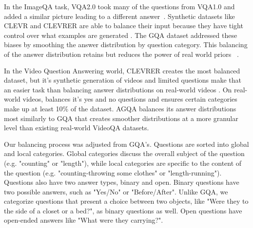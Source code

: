In the ImageQA task, VQA2.0 took many of the questions from VQA1.0 and added a similar picture leading to a different answer~\cite{goyal2017making}. Synthetic datasets like CLEVR and CLEVRER are able to balance their input because they have tight control over what examples are generated \cite{johnson2017clevr, yi2019clevrer}. The GQA dataset addressed these biases by smoothing the answer distribution by question category. This balancing of the answer distribution retains but reduces the power of real world priors ~\cite{hudson2019gqa}. 

In the Video Question Answering world, CLEVRER creates the most balanced dataset, but it's synthetic generation of videos and limited questions make that an easier task than balancing answer distributions on real-world videos \cite{yi2019clevrer}. On real-world videos, \cite{yu2019activitynet} balances it's yes and no questions and ensures certain categories make up at least 10\% of the dataset. AGQA balances its answer distributions most similarly to GQA that creates smoother distributions at a more granular level than existing real-world VideoQA datasets. 

Our balancing process was adjusted from GQA's. Questions are sorted into global and local categories. Global categories discuss the overall subject of the question (e.g. "counting" or "length"), while local categories are specific to the content of the question (e.g. "counting-throwing some clothes" or "length-running"). Questions also have two answer types, binary and open. Binary questions have two possible answers, such as "Yes/No" or "Before/After". Unlike GQA, we categorize questions that present a choice between two objects, like "Were they to the side of a closet or a bed?", as binary questions as well. Open questions have open-ended answers like "What were they carrying?". 

